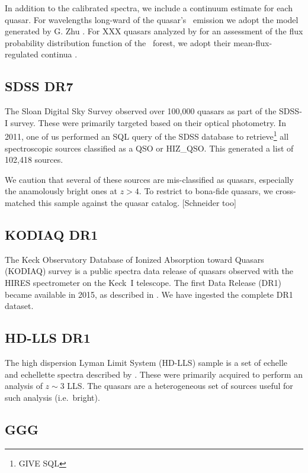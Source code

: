 \documentclass[12pt,preprint]{aastex}
\begin{document}
In addition to the calibrated spectra, we include a
continuum estimate for each quasar.  For wavelengths
long-ward of the quasar's \lya\ emission we adopt
the model generated by G. Zhu 
\citep[see][for details on the algorithm]{zhu15}.
For XXX quasars analyzed by \cite{lee1X} for an assessment
of the flux probability distribution function of the 
\lya\ forest, we adopt their mean-flux-regulated continua
\citep{lee1Xb}.

%
\subsection{SDSS DR7}
\label{sec:dr7}

The Sloan Digital Sky Survey observed over 100,000 quasars
as part of the SDSS-I survey.  These were primarily targeted
based on their optical photometry.  In 2011, one of us
performed an SQL query of the SDSS database to retrieve\footnote{GIVE SQL}
all spectroscopic sources classified as a QSO or HIZ\_QSO. 
This generated a list of 102,418 sources.  

We caution that several of these sources are mis-classified
as quasars, especially the anamolously bright ones at $z>4$.
To restrict to bona-fide quasars, we cross-matched this
sample against the \cite{meyers1X} quasar catalog.
[Schneider too]

\subsection{KODIAQ DR1}
\label{sec:kodiaq}

The Keck Observatory Database of Ionized Absorption toward Quasars (KODIAQ) survey is a public spectra data release of quasars observed with the HIRES spectrometer 
\citep{vogt94} on the Keck~I telescope. 
The first Data Release (DR1) became available in 2015, 
as described in \cite{kodiaq_dr1}. 
We have ingested the complete DR1 dataset.

\subsection{HD-LLS DR1}
\label{sec:hdlls}

The high dispersion Lyman Limit System (HD-LLS) sample is a set of echelle and echellette spectra described by \cite{hdlls}.  These were primarily acquired
to perform an analysis of $z \sim 3$ LLS. 
The quasars are a heterogeneous set of sources useful for such 
analysis (i.e.\ bright).

\subsection{GGG}
\label{sec:ggg}
\end{document}
